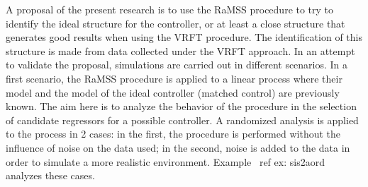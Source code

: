 A proposal of the present research is to use the RaMSS procedure to try to identify the ideal structure for the controller, or at least a close structure that generates good results when using the VRFT procedure. The identification of this structure is made from data collected under the VRFT approach. In an attempt to validate the proposal, simulations are carried out in different scenarios.
In a first scenario, the RaMSS procedure is applied to a linear process where their model and the model of the ideal controller (matched control) are previously known.
The aim here is to analyze the behavior of the procedure in the selection of candidate regressors for a possible controller.
A randomized analysis is applied to the process in 2 cases: in the first, the procedure is performed without the influence of noise on the data used; in the second, noise is added to the data in order to simulate a more realistic environment.
Example \ ref {ex: sis2aord} analyzes these cases.

